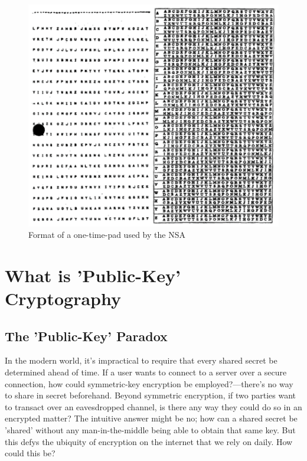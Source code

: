 \documentclass[11pt, a4paper]{report}
\begin{document}
\begin{figure}[h]
\begin{center}
\includegraphics[scale=.29]{diana} 
\caption{Format of a one-time-pad used by the NSA\autocite{diana}}
\end{center}
\end{figure}


\section{What is 'Public-Key' Cryptography}

\subsection{The 'Public-Key' Paradox}

In the modern world, it's impractical to require that every shared secret be determined ahead of time. If a user wants to connect to a server over a secure connection, how could symmetric-key encryption be employed?—there's no way to share in secret beforehand.
Beyond symmetric encryption, if two parties want to transact over an eavesdropped channel, is there any way they could do so in an encrypted matter? The intuitive answer might be no; how can a shared secret be 'shared' without any man-in-the-middle being able to obtain that same key. But this defys the ubiquity of encryption on the internet that we rely on daily. How could this be?
\end{document}
